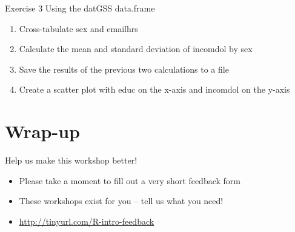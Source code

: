 \documentclass[table,smaller]{beamer}
\begin{document}
\begin{frame}[label=sec-7-10]{Exercise 3}
Using the datGSS data.frame

\begin{enumerate}
\item Cross-tabulate sex and emailhrs
\item Calculate the mean and standard deviation of incomdol by sex
\item Save the results of the previous two calculations to a file
\item Create a scatter plot with educ on the x-axis and incomdol on the y-axis
\end{enumerate}
\end{frame}

\section{Wrap-up}
\label{sec-8}

\begin{frame}[label=sec-8-1]{Help us make this workshop better!}
\begin{itemize}
\item Please take a moment to fill out a very short feedback form

\item These workshops exist for you – tell us what you need!

\item \url{http://tinyurl.com/R-intro-feedback}
\end{itemize}
\end{frame}
\end{document}
